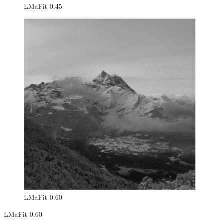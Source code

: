 \begin{figure}[!ht]
\begin{subfigure}{0.325\linewidth}
        \caption{LMaFit $0.45$}
    \end{subfigure}
    \begin{subfigure}{0.325\linewidth}
        \includegraphics[width=\linewidth]{Poglavja/Slike/grayscale1000/slikaRez60LmaFIT77.png}
        \caption{LMaFit $0.60$}
    \end{subfigure}
\end{figure}